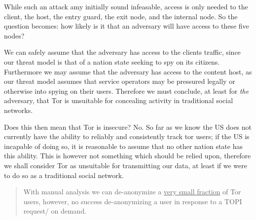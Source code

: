While such an attack amy initially sound infeasable, access is only needed to
the client, the host, the entry guard, the exit node, and the internal node.
So the question becomes: how likely is it that an adversary will have access to
these five nodes?

We can safely assume that the adversary has access to the clients traffic, since
our threat model is that of a nation state seeking to spy on its citizens.
Furthermore we may assume that the adversary has access to the content host, as
our threat model assumes that service operators may be pressured legally or
otherwise into spying on their users. Therefore we must conclude, at least for
\textit{the} adversary, that Tor is unsuitable for concealing activity in
traditional social networks.

Does this then mean that Tor is insecure? No. So far as we know\cite{torStinks}
the US does not currently have the ability to reliably and consistently track
tor users; if the US is incapable of doing so, it is reasonable to assume that
no other nation state has this ability. This is however not something which
should be relied upon, therefore we shall consider Tor as unsuitable for
transmitting our data, at least if we were to do so as a traditional social
network.

\begin{quote}
With manual analysis we can de-anonymize a \uline{very small fraction} of Tor
users, however, no success de-anonymizing a user in response to a TOPI request/
on demand\cite{torStinks}.
\end{quote}
